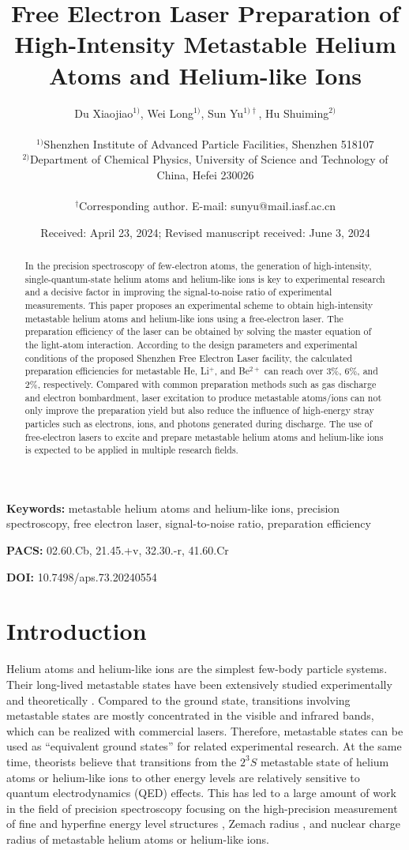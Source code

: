 \documentclass[12pt,a4paper]{article}
\title{\textbf{Free Electron Laser Preparation of High-Intensity Metastable Helium Atoms and Helium-like Ions}}
\author{
Du Xiaojiao$^{1)}$, Wei Long$^{1)}$, Sun Yu$^{1)\dagger}$, Hu Shuiming$^{2)}$ \\
\\
$^{1)}$Shenzhen Institute of Advanced Particle Facilities, Shenzhen 518107 \\
$^{2)}$Department of Chemical Physics, University of Science and Technology of China, Hefei 230026 \\
\\
$^\dagger$Corresponding author. E-mail: sunyu@mail.iasf.ac.cn
}
\date{Received: April 23, 2024; Revised manuscript received: June 3, 2024}
\begin{document}
\maketitle

\begin{abstract}
In the precision spectroscopy of few-electron atoms, the generation of high-intensity, single-quantum-state helium atoms and helium-like ions is key to experimental research and a decisive factor in improving the signal-to-noise ratio of experimental measurements. This paper proposes an experimental scheme to obtain high-intensity metastable helium atoms and helium-like ions using a free-electron laser. The preparation efficiency of the laser can be obtained by solving the master equation of the light-atom interaction. According to the design parameters and experimental conditions of the proposed Shenzhen Free Electron Laser facility, the calculated preparation efficiencies for metastable He, Li$^{+}$, and Be$^{2+}$ can reach over 3\%, 6\%, and 2\%, respectively. Compared with common preparation methods such as gas discharge and electron bombardment, laser excitation to produce metastable atoms/ions can not only improve the preparation yield but also reduce the influence of high-energy stray particles such as electrons, ions, and photons generated during discharge. The use of free-electron lasers to excite and prepare metastable helium atoms and helium-like ions is expected to be applied in multiple research fields.
\end{abstract}

\textbf{Keywords:} metastable helium atoms and helium-like ions, precision spectroscopy, free electron laser, signal-to-noise ratio, preparation efficiency

\textbf{PACS:} 02.60.Cb, 21.45.+v, 32.30.-r, 41.60.Cr

\textbf{DOI:} 10.7498/aps.73.20240554

\section{Introduction}

Helium atoms and helium-like ions are the simplest few-body particle systems. Their long-lived metastable states have been extensively studied experimentally \cite{ref1-20} and theoretically \cite{ref26-36}. Compared to the ground state, transitions involving metastable states are mostly concentrated in the visible and infrared bands, which can be realized with commercial lasers. Therefore, metastable states can be used as ``equivalent ground states'' for related experimental research. At the same time, theorists believe that transitions from the $2^3S$ metastable state of helium atoms or helium-like ions to other energy levels are relatively sensitive to quantum electrodynamics (QED) effects. This has led to a large amount of work in the field of precision spectroscopy focusing on the high-precision measurement of fine and hyperfine energy level structures \cite{ref1,ref7-10,ref14-20,ref26-35}, Zemach radius \cite{ref19,ref34}, and nuclear charge radius \cite{ref11,ref13} of metastable helium atoms or helium-like ions.
\end{document}
